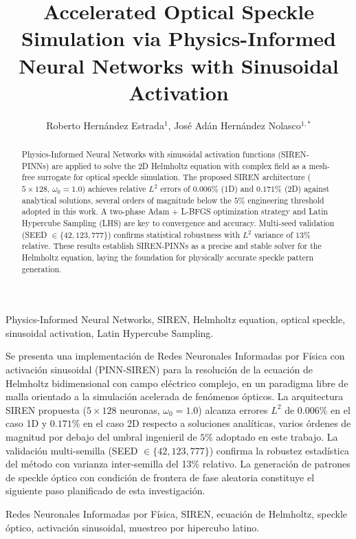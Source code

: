 \documentclass[spanish]{cys}
\title{Accelerated Optical Speckle Simulation via Physics-Informed Neural
       Networks with Sinusoidal Activation}
\author{Roberto Hernández Estrada$^1$, José Adán Hernández Nolasco$^{1,*}$}
\affil{
$^1$ Universidad Juárez Autónoma de Tabasco, División Académica de Ciencias Básicas,
Cunduacán, \authorcr
México \authorcr \authorcr
robertohernandezestrd@gmail.com, jose.hernandez@ujat.mx \authorcr \authorcr
}
\begin{document}
\maketitle
\renewcommand{\tablename}{Tabla}

\begin{abstract}
Physics-Informed Neural Networks with sinusoidal activation functions (SIREN-PINNs)
are applied to solve the 2D Helmholtz equation with complex field as a mesh-free
surrogate for optical speckle simulation.
The proposed SIREN architecture ($5 \times 128$, $\omega_0 = 1.0$) achieves relative
$L^2$ errors of $0.006\%$ (1D) and $0.171\%$ (2D) against analytical solutions,
several orders of magnitude below the $5\%$ engineering threshold adopted in this
work.
A two-phase Adam + L-BFGS optimization strategy and Latin Hypercube Sampling (LHS)
are key to convergence and accuracy.
Multi-seed validation (SEED $\in \{42, 123, 777\}$) confirms statistical robustness with
$L^2$ variance of $13\%$ relative.
These results establish SIREN-PINNs as a precise and stable solver for the Helmholtz
equation, laying the foundation for physically accurate speckle pattern generation.
\end{abstract}

\begin{keywords}
Physics-Informed Neural Networks, SIREN, Helmholtz equation, optical speckle,
sinusoidal activation, Latin Hypercube Sampling.
\end{keywords}


\begin{resumen}
Se presenta una implementación de Redes Neuronales Informadas por Física con
activación sinusoidal (PINN-SIREN) para la resolución de la ecuación de Helmholtz
bidimensional con campo eléctrico complejo, en un paradigma libre de malla orientado
a la simulación acelerada de fenómenos ópticos.
La arquitectura SIREN propuesta ($5 \times 128$ neuronas, $\omega_0 = 1.0$)
alcanza errores $L^2$ de $0.006\%$ en el caso 1D y $0.171\%$ en el caso 2D
respecto a soluciones analíticas, varios órdenes de magnitud por debajo del
umbral ingenieril de $5\%$ adoptado en este trabajo.
La validación multi-semilla (SEED $\in \{42, 123, 777\}$) confirma la robustez
estadística del método con varianza inter-semilla del 13\% relativo.
La generación de patrones de speckle óptico con condición de frontera de fase
aleatoria constituye el siguiente paso planificado de esta investigación.
\end{resumen}

\begin{palabrasclave}
Redes Neuronales Informadas por Física, SIREN, ecuación de Helmholtz, speckle
óptico, activación sinusoidal, muestreo por hipercubo latino.
\end{palabrasclave}







{


}
\end{document}
